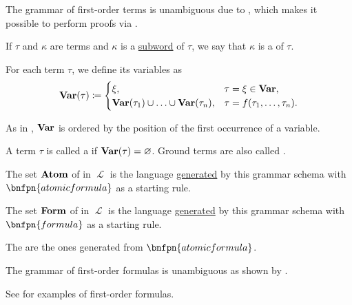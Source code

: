 \begin{definition}
\begin{thmenum}
    The grammar of first-order terms is unambiguous due to , which makes it possible to perform proofs via .

     If \( \tau \) and \( \kappa \) are terms and \( \kappa \) is a \hyperref[def:formal_language/subword]{subword} of \( \tau \), we say that \( \kappa \) is a  of \( \tau \).

     For each term \( \tau \), we define its variables as
    \begin{equation}\label{eq:def:first_order_syntax/term_variables}
      \operatorname{\mathbf{Var}}(\tau) \coloneqq \begin{cases}
        \xi,                                                        &\tau = \xi \in \operatorname{\mathbf{Var}}, \\
        \operatorname{\mathbf{Var}}(\tau_1) \cup \ldots \cup \operatorname{\mathbf{Var}}(\tau_n), &\tau = f(\tau_1, \ldots, \tau_n).
      \end{cases}
    \end{equation}

    As in , \( \operatorname{\mathbf{Var}} \) is ordered by the position of the first occurrence of a variable.

     A term \( \tau \) is called a  if \( \operatorname{\mathbf{Var}}(\tau) = \varnothing \). Ground terms are also called .

     The set \( \operatorname{\mathbf{Atom}} \) of  in \( \mscrL \) is the language \hyperref[def:formal_grammar/language]{generated} by this grammar schema with \( \bnfpn{atomic formula} \) as a starting rule.

     The set \( \operatorname{\mathbf{Form}} \) of  in \( \mscrL \) is the language \hyperref[def:formal_grammar/language]{generated} by this grammar schema with \( \bnfpn{formula} \) as a starting rule.

    The  are the ones generated from \( \bnfpn{atomic formula} \).

    The grammar of first-order formulas is unambiguous as shown by .

    See  for examples of first-order formulas.


\end{thmenum}
\end{definition}
